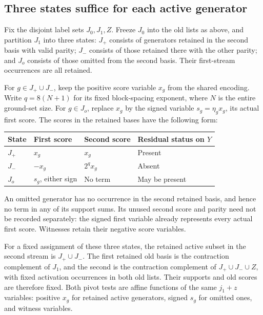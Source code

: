 \documentclass[11pt]{article}
\begin{document}
\subsection{Three states suffice for each active generator}\label{three-states-suffice-for-each-active-generator}

Fix the disjoint label sets \(J_0,J_1,Z\). Freeze \(J_0\) into the old lists as above, and partition \(J_1\) into three states: \(J_+\) consists of generators retained in the second basis with valid parity; \(J_-\) consists of those retained there with the other parity; and \(J_o\) consists of those omitted from the second basis. Their first-stream occurrences are all retained.

For \(g\in J_+\cup J_-\), keep the positive score variable \(x_g\) from the shared encoding. Write \(q=8(N+1)\) for its fixed block-spacing exponent, where \(N\) is the entire ground-set size. For \(g\in J_o\), replace \(x_g\) by the signed variable \(s_g=\eta_gx_g\), its actual first score. The scores in the retained bases have the following form:

{\def\LTcaptype{none} %
\begin{longtable}[]{@{}llll@{}}
\toprule\noalign{}
State & First score & Second score & Residual status on \(Y\) \\
\midrule\noalign{}
\endhead
\bottomrule\noalign{}
\endlastfoot
\(J_+\) & \(x_g\) & \(x_g\) & Present \\
\(J_-\) & \(-x_g\) & \(2^q x_g\) & Absent \\
\(J_o\) & \(s_g\), either sign & No term & May be present \\
\end{longtable}
}

An omitted generator has no occurrence in the second retained basis, and hence no term in any of its support sums. Its unused second score and parity need not be recorded separately: the signed first variable already represents every actual first score. Witnesses retain their negative score variables.

For a fixed assignment of these three states, the retained active subset in the second stream is \(J_+\cup J_-\). The first retained old basis is the contraction complement of \(J_1\), and the second is the contraction complement of \(J_+\cup J_-\cup Z\), with fixed activation occurrences in both old lists. Their supports and old scores are therefore fixed. Both pivot tests are affine functions of the same \(j_1+z\) variables: positive \(x_g\) for retained active generators, signed \(s_g\) for omitted ones, and witness variables.
\end{document}
